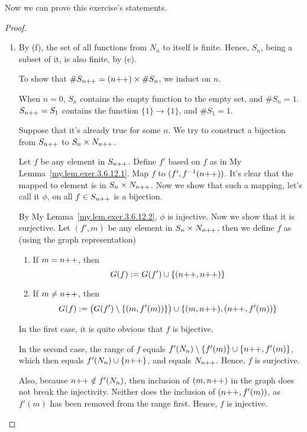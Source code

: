 Now we can prove this exercise's statements.
\begin{proof}\leavevmode
\begin{enumerate}
	\item 
		By  (f), the set of all functions from $N_n$ to itself is finite. Hence, $S_n$, being a subset of it, is also finite, by (c).

		To show that $\#S_{n{+}{+}} = (n{+}{+}) \times \#S_n$, we induct on $n$.

		\mybcbox When $n = 0$, $S_n$ contains the empty function to the empty set, and $\#S_n = 1$. $S_{n{+}{+}} = S_1$ contains the function $\{1\} \to \{1\}$, and $\#S_1 = 1$.

		\myisbox Suppose that it's already true for some $n$. We try to construct a bijection from $S_{n{+}{+}}$ to $S_n \times N_{n{+}{+}}$.

		Let $f$ be any element in $S_{n{+}{+}}$. Define $f'$ based on $f$ as in My Lemma~\ref{my.lem.exer.3.6.12.1}. Map $f$ to $(f', f^{-1}(n{+}{+}))$. It's clear that the mapped to element is in $S_n \times N_{n{+}{+}}$. Now we show that such a mapping, let's call it $\phi$, on all $f \in S_{n{+}{+}}$ is a bijection.

		By My Lemma~\ref{my.lem.exer.3.6.12.2}, $\phi$ is injective. Now we show that it is surjective. Let $(f',m)$ be any element in $S_n \times N_{n{+}{+}}$, then we define $f$ as (using the graph representation)
		\begin{enumerate}
			\item If $m = n{+}{+}$, then
			\[ 
				G(f) := G(f') \cup \{(n{+}{+}, n{+}{+})\}
			\]
			\item If $m \ne n{+}{+}$, \label{exer.3.6.12.fp.con.2}
			then 
			\[
				G(f) := \bigl(G(f') \setminus \{(m, f'(m))\}\bigr) \cup \{(m, n{+}{+}), (n{+}{+}, f'(m))\}
			\]
		\end{enumerate}
		
		In the first case, it is quite obvious that $f$ is bijective.

		In the second case, the range of $f$ equals $f'(N_n) \setminus \{f'(m)\} \cup \{n{+}{+}, f'(m)\}$, which then equals
		$f'(N_n) \cup \{n{+}{+}\}$, and equals $N_{n{+}{+}}$. Hence, $f$ is surjective.

		Also, because $n{+}{+} \notin f'(N_n)$, then inclusion of $(m, n{+}{+})$ in the graph does not break the injectivity.
		Neither does the inclusion of $(n{+}{+}, f'(m))$, as $f'(m)$ has been removed from the range first. Hence, $f$ is injective.


\end{enumerate}
\end{proof}
